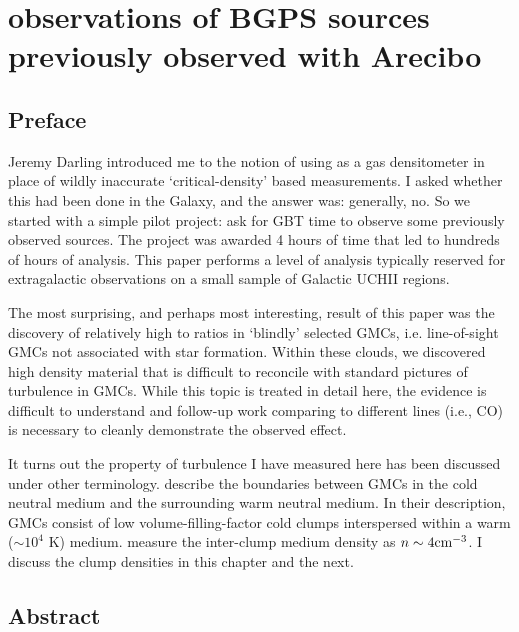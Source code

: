 
%
%

\chapter{\formaldehyde observations of BGPS sources previously observed with Arecibo}
\label{ch:h2co}
\section{Preface}
Jeremy Darling introduced me to the notion of using \formaldehyde as a gas
densitometer in place of wildly inaccurate `critical-density' based
measurements.  I asked whether this had been done in the Galaxy, and the
answer was: generally, no.  So we started with a simple pilot project:
ask for GBT time to observe some previously observed \formaldehyde sources.
The project was awarded 4 hours of time that led to hundreds of hours of analysis.
This paper performs a level of analysis typically reserved for extragalactic
observations on a small sample of Galactic UCHII regions.

The most surprising, and perhaps most interesting, result of this paper was the
discovery of relatively high \formaldehyde \twotwo to \oneone ratios in
`blindly' selected GMCs, i.e.  line-of-sight GMCs not associated with star
formation.  Within these clouds, we discovered high density material that is
difficult to reconcile with standard pictures of turbulence in GMCs.  While
this topic is treated in detail here, the evidence is difficult to understand
and follow-up work comparing to different lines (i.e., CO) is necessary to
cleanly demonstrate the observed effect.

It turns out the property of turbulence I have measured here has been discussed 
under other terminology.  \citet{Hennebelle2012a} describe the boundaries between
GMCs in the cold neutral medium and the surrounding warm neutral medium.  In their
description, GMCs consist of low volume-filling-factor cold clumps interspersed
within a warm ($\sim10^4$ K) medium. \citet{Williams1995a} measure the inter-clump
medium density as $n\sim4 \textrm{cm}^{-3}$.  I discuss the clump densities in this chapter
and the next.

\section{Abstract}

